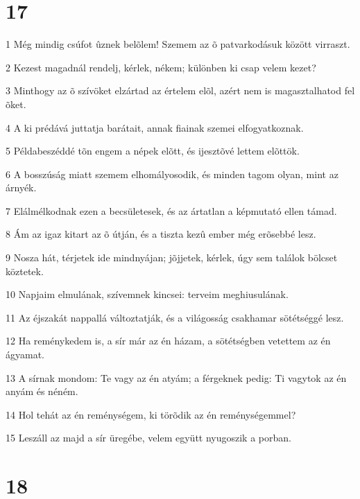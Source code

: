 \chapter{17}

\par 1 Még mindig csúfot ûznek belõlem! Szemem az õ patvarkodásuk között virraszt.
\par 2 Kezest magadnál rendelj, kérlek, nékem; különben ki csap velem kezet?
\par 3 Minthogy az õ szívöket elzártad az értelem elõl, azért nem is magasztalhatod fel õket.
\par 4 A ki prédává juttatja barátait, annak fiainak szemei elfogyatkoznak.
\par 5 Példabeszéddé tõn engem a népek elõtt, és ijesztõvé lettem elõttök.
\par 6 A bosszúság miatt szemem elhomályosodik, és minden tagom olyan, mint az árnyék.
\par 7 Elálmélkodnak ezen a becsületesek, és az ártatlan a képmutató ellen támad.
\par 8 Ám az igaz kitart az õ útján, és a tiszta kezû ember még erõsebbé lesz.
\par 9 Nosza hát, térjetek ide mindnyájan; jõjjetek, kérlek, úgy sem találok bölcset köztetek.
\par 10 Napjaim elmulának, szívemnek kincsei: terveim meghiusulának.
\par 11 Az éjszakát nappallá változtatják, és a világosság csakhamar sötétséggé lesz.
\par 12 Ha reménykedem is, a sír már az én házam, a sötétségben vetettem az én ágyamat.
\par 13 A sírnak mondom: Te vagy az én atyám; a férgeknek pedig: Ti vagytok az én anyám és néném.
\par 14 Hol tehát az én reménységem, ki törõdik az én reménységemmel?
\par 15 Leszáll az majd a sír üregébe, velem együtt nyugoszik a porban.

\chapter{18}


